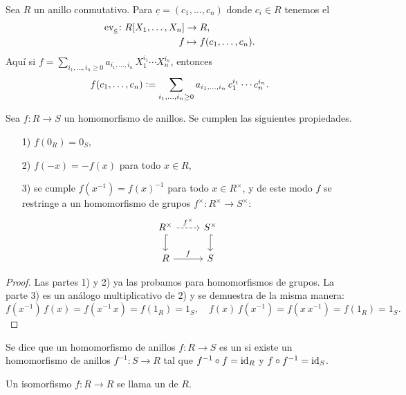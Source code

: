 \begin{ejemplo}
  Sea $R$ un anillo conmutativo. Para $\underline{c} = (c_1,\ldots,c_n)$ donde
  $c_i \in R$ tenemos el
  \begin{align*}
    \operatorname{ev}_{\underline{c}}\colon R [X_1,\ldots,X_n] & \to R,\\
    f & \mapsto f (c_1,\ldots,c_n).
  \end{align*}
  Aquí si
  $f = \sum_{i_1,\ldots,i_n \ge 0} a_{i_1,\ldots,i_n}\,X_1^{i_1}\cdots X_n^{i_n}$,
  entonces
  \[ f (c_1,\ldots,c_n) \mathrel{\mathop:}=
     \sum_{i_1,\ldots,i_n \ge 0} a_{i_1,\ldots,i_n}\,c_1^{i_1}\cdots c_n^{i_n}. \qedhere \]
\end{ejemplo}

\begin{observacion}
  Sea $f\colon R\to S$ un homomorfismo de anillos. Se cumplen las siguientes
  propiedades.

  \begin{enumerate}
  \item[1)] $f (0_R) = 0_S$,

  \item[2)] $f (-x) = -f (x)$ para todo $x\in R$,

  \item[3)] se cumple $f (x^{-1}) = f (x)^{-1}$ para todo $x\in R^\times$,
    y de este modo $f$ se restringe a un homomorfismo de grupos
    $f^\times\colon R^\times \to S^\times$:
    \[ \begin{tikzcd}
        R^\times\ar[hookrightarrow]{d}\ar[dashed]{r}{f^\times} &
        S^\times \ar[hookrightarrow]{d} \\
        R \ar{r}{f} & S
      \end{tikzcd} \]
  \end{enumerate}

  \begin{proof}
    Las partes 1) y 2) ya las probamos para homomorfismos de grupos. La parte 3)
    es un análogo multiplicativo de 2) y se demuestra de la misma manera:
    \[ f (x^{-1})\,f(x) = f (x^{-1}\,x) = f (1_R) = 1_S, \quad
       f (x)\,f(x^{-1}) = f (x\,x^{-1}) = f (1_R) = 1_S. \]
  \end{proof}
\end{observacion}

\begin{definicion}
  Se dice que un homomorfismo de anillos $f\colon R\to S$ es
  un  si existe un homomorfismo
  de anillos $f^{-1}\colon S\to R$ tal que $f^{-1}\circ f = \mathrm{id}_{R}$
  y $f\circ f^{-1} = \mathrm{id}_{S}$.

  Un isomorfismo $f\colon R\to R$ se llama un
   de $R$.
\end{definicion}

